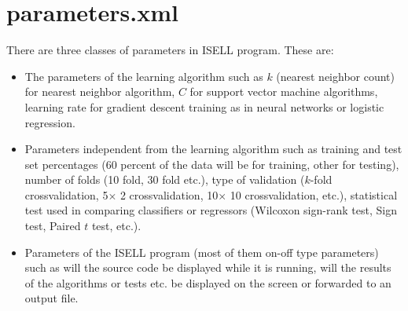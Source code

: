 \documentclass[a4paper,12pt]{book}
\begin{document}
\section{parameters.xml}

There are three classes of parameters in ISELL program. These are:
\begin{itemize}
\item The parameters of the learning algorithm such as $k$ (nearest neighbor count) for nearest neighbor algorithm, $C$ for support vector machine algorithms, learning rate for gradient descent training as in neural networks or logistic regression.
\item Parameters independent from the learning algorithm such as training and test set percentages (60 percent of the data will be for training, other for testing), number of folds (10 fold, 30 fold etc.), type of validation ($k$-fold crossvalidation, 5$\times$ 2 crossvalidation, 10$\times$ 10 crossvalidation, etc.), statistical test used in comparing classifiers or regressors (Wilcoxon sign-rank test, Sign test, Paired $t$ test, etc.).
\item Parameters of the ISELL program (most of them on-off type parameters) such as will the source code be displayed while it is running, will the results of the algorithms or tests etc. be displayed on the screen or forwarded to an output file.
\end{itemize}
\end{document}
